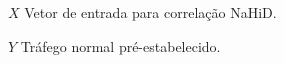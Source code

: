 \begin{simbolos} \setlength{\itemsep}{0.0001\baselineskip} \addtolength{\labelwidth}{1ex}
  \item[$X$] Vetor de entrada para correlação NaHiD.
  \item[$Y$] Tráfego normal pré-estabelecido.
  
\end{simbolos}
